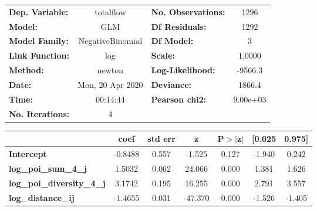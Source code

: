\begin{center}
\begin{tabular}{lclc}
\toprule
\textbf{Dep. Variable:}            &    totalflow     & \textbf{  No. Observations:  } &     1296    \\
\textbf{Model:}                    &       GLM        & \textbf{  Df Residuals:      } &     1292    \\
\textbf{Model Family:}             & NegativeBinomial & \textbf{  Df Model:          } &        3    \\
\textbf{Link Function:}            &       log        & \textbf{  Scale:             } &    1.0000   \\
\textbf{Method:}                   &      newton      & \textbf{  Log-Likelihood:    } &   -9566.3   \\
\textbf{Date:}                     & Mon, 20 Apr 2020 & \textbf{  Deviance:          } &    1866.4   \\
\textbf{Time:}                     &     00:14:44     & \textbf{  Pearson chi2:      } &  9.00e+03   \\
\textbf{No. Iterations:}           &        4         & \textbf{                     } &             \\
\bottomrule
\end{tabular}
\begin{tabular}{lcccccc}
                                   & \textbf{coef} & \textbf{std err} & \textbf{z} & \textbf{P$> |$z$|$} & \textbf{[0.025} & \textbf{0.975]}  \\
\midrule
\textbf{Intercept}                 &      -0.8488  &        0.557     &    -1.525  &         0.127        &       -1.940    &        0.242     \\
\textbf{log\_poi\_sum\_4\_j}       &       1.5032  &        0.062     &    24.066  &         0.000        &        1.381    &        1.626     \\
\textbf{log\_poi\_diversity\_4\_j} &       3.1742  &        0.195     &    16.255  &         0.000        &        2.791    &        3.557     \\
\textbf{log\_distance\_ij}         &      -1.4655  &        0.031     &   -47.370  &         0.000        &       -1.526    &       -1.405     \\
\bottomrule
\end{tabular}
\end{center}